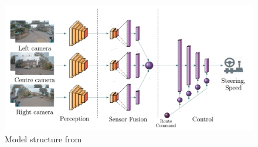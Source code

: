 \vspace{3cm}

\begin{figure}[hbtp]
     \centering
    \includegraphics[keepaspectratio, scale=0.3]
         {images/hawke.png}
    \caption{Model structure from \cite{hawke}}
    \label{Fig:hawke}
\end{figure}

\newpage